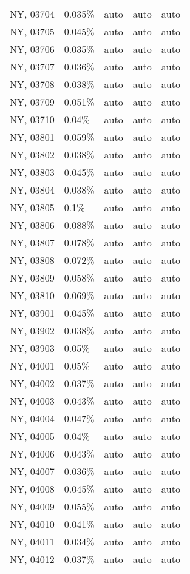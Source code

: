 \begin{longtable}[]{@{}lllll@{}}
NY, 03704 & 0.035\% & auto & auto & auto \\
NY, 03705 & 0.045\% & auto & auto & auto \\
NY, 03706 & 0.035\% & auto & auto & auto \\
NY, 03707 & 0.036\% & auto & auto & auto \\
NY, 03708 & 0.038\% & auto & auto & auto \\
NY, 03709 & 0.051\% & auto & auto & auto \\
NY, 03710 & 0.04\% & auto & auto & auto \\
NY, 03801 & 0.059\% & auto & auto & auto \\
NY, 03802 & 0.038\% & auto & auto & auto \\
NY, 03803 & 0.045\% & auto & auto & auto \\
NY, 03804 & 0.038\% & auto & auto & auto \\
NY, 03805 & 0.1\% & auto & auto & auto \\
NY, 03806 & 0.088\% & auto & auto & auto \\
NY, 03807 & 0.078\% & auto & auto & auto \\
NY, 03808 & 0.072\% & auto & auto & auto \\
NY, 03809 & 0.058\% & auto & auto & auto \\
NY, 03810 & 0.069\% & auto & auto & auto \\
NY, 03901 & 0.045\% & auto & auto & auto \\
NY, 03902 & 0.038\% & auto & auto & auto \\
NY, 03903 & 0.05\% & auto & auto & auto \\
NY, 04001 & 0.05\% & auto & auto & auto \\
NY, 04002 & 0.037\% & auto & auto & auto \\
NY, 04003 & 0.043\% & auto & auto & auto \\
NY, 04004 & 0.047\% & auto & auto & auto \\
NY, 04005 & 0.04\% & auto & auto & auto \\
NY, 04006 & 0.043\% & auto & auto & auto \\
NY, 04007 & 0.036\% & auto & auto & auto \\
NY, 04008 & 0.045\% & auto & auto & auto \\
NY, 04009 & 0.055\% & auto & auto & auto \\
NY, 04010 & 0.041\% & auto & auto & auto \\
NY, 04011 & 0.034\% & auto & auto & auto \\
NY, 04012 & 0.037\% & auto & auto & auto \\

\end{longtable}
